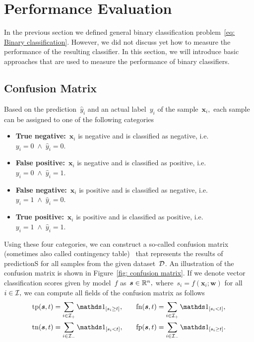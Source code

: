 
\section{Performance Evaluation}

In the previous section we defined general binary classification problem~\ref{eq: Binary classification}. However, we did not discuss yet how to measure the performance of the resulting classifier. In this section, we will introduce basic approaches that are used to measure the performance of binary classifiers.

\subsection{Confusion Matrix}
Based on the prediction~$\hat{y}_i$ and an actual label~$y_i$ of the sample~$\bm{x}_i,$ each sample can be assigned to one of the following categories
\begin{itemize}
  \item \textbf{True negative:}~$\bm{x}_i$ is negative and is classified as negative, i.e.~$y_i = 0 \; \land \; \hat{y}_i = 0.$
  \item \textbf{False positive:}~$\bm{x}_i$ is negative and is classified as positive, i.e.~$y_i = 0 \; \land \; \hat{y}_i = 1.$
  \item \textbf{False negative:}~$\bm{x}_i$ is positive and is classified as negative, i.e.~$y_i = 1 \; \land \; \hat{y}_i = 0.$
  \item \textbf{True positive:}~$\bm{x}_i$ is positive and is classified as positive, i.e.~$y_i = 1 \; \land \; \hat{y}_i = 1.$
\end{itemize}
Using these four categories, we can construct a so-called confusion matrix (sometimes also called contingency table)~\cite{fawcett2006introduction} that represents the results of predictionS for all samples from the given dataset~$\mathcal{D}$. An illustration of the confusion matrix is shown in Figure~\ref{fig: confusion matrix}. If we denote vector classification scores given by model~$f$ as~$\bm{s} \in \mathbb{R}^n,$ where~$s_i = f(\bm{x}_i; \bm{w})$ for all~$i \in \mathcal{I},$ we can compute all fields of the confusion matrix as follows
\begin{equation}\label{eq: confusion counts}
  \begin{aligned}
    \tp(\bm{s}, t) & = \sum_{i \in \Ipos}\Iverson{s_i \ge t}, & \quad
    \fn(\bm{s}, t) & = \sum_{i \in \Ipos}\Iverson{s_i < t}, \\
    \tn(\bm{s}, t) & = \sum_{i \in \Ineg}\Iverson{s_i < t}, & \quad
    \fp(\bm{s}, t) & = \sum_{i \in \Ineg}\Iverson{s_i \ge t}.
  \end{aligned}
\end{equation}

